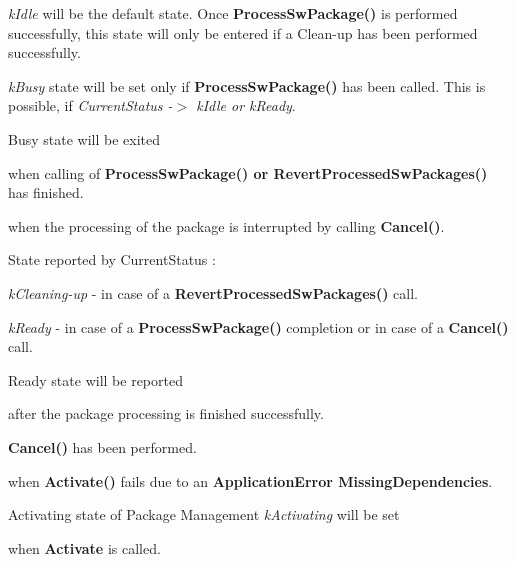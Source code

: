 \begin{DoxyItemize}
\item {\itshape k\+Idle} will be the default state. Once {\bfseries Process\+Sw\+Package()} is performed successfully, this state will only be entered if a Clean-\/up has been performed successfully.
\item {\itshape k\+Busy} state will be set only if {\bfseries Process\+Sw\+Package()} has been called. This is possible, if {\itshape Current\+Status -\/$>$ k\+Idle or k\+Ready}.
\item Busy state will be exited
\begin{DoxyItemize}
\item when calling of {\bfseries Process\+Sw\+Package() or Revert\+Processed\+Sw\+Packages()} has finished.
\item when the processing of the package is interrupted by calling {\bfseries Cancel()}. 
\end{DoxyItemize}

State reported by Current\+Status \+:
\begin{DoxyItemize}
\item {\itshape k\+Cleaning-\/up} -\/ in case of a {\bfseries Revert\+Processed\+Sw\+Packages()} call.
\item {\itshape k\+Ready} -\/ in case of a {\bfseries Process\+Sw\+Package()} completion or in case of a {\bfseries Cancel()} call.
\end{DoxyItemize}
\item Ready state will be reported
\begin{DoxyItemize}
\item after the package processing is finished successfully.
\item {\bfseries Cancel()} has been performed.
\item when {\bfseries Activate()} fails due to an {\bfseries Application\+Error Missing\+Dependencies}.
\end{DoxyItemize}
\item Activating state of Package Management {\itshape k\+Activating} will be set
\begin{DoxyItemize}
\item when {\bfseries Activate} is called. 
\end{DoxyItemize}


\end{DoxyItemize}
